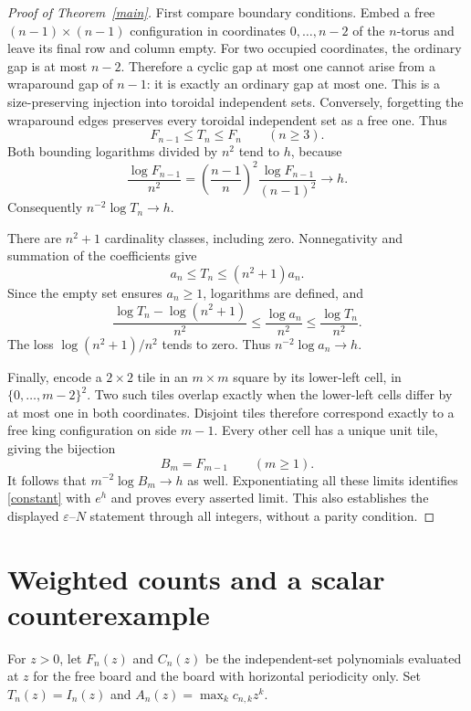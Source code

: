 \documentclass[10pt]{article}
\begin{document}
\begin{proof}[Proof of Theorem~\ref{main}]
First compare boundary conditions. Embed a free $(n-1)\times(n-1)$
configuration in coordinates $0,\ldots,n-2$ of the $n$-torus and
leave its final row and column empty. For two occupied coordinates,
the ordinary gap is at most $n-2$. Therefore a cyclic gap at most
one cannot arise from a wraparound gap of $n-1$: it is exactly an
ordinary gap at most one. This is a size-preserving injection into
toroidal independent sets. Conversely, forgetting the wraparound
edges preserves every toroidal independent set as a free one. Thus
\[
 F_{n-1}\leq T_n\leq F_n\qquad(n\geq3).
 \tag{2}\label{seam}
\]
Both bounding logarithms divided by $n^2$ tend to $h$, because
\[
 \frac{\log F_{n-1}}{n^2}
 =\left(\frac{n-1}{n}\right)^2
   \frac{\log F_{n-1}}{(n-1)^2}\longrightarrow h.
\]
Consequently $n^{-2}\log T_n\to h$.

There are $n^2+1$ cardinality classes, including zero. Nonnegativity
and summation of the coefficients give
\[
 a_n\leq T_n\leq(n^2+1)a_n.
 \tag{3}\label{peak}
\]
Since the empty set ensures $a_n\geq1$, logarithms are defined, and
\[
 \frac{\log T_n-\log(n^2+1)}{n^2}
 \leq\frac{\log a_n}{n^2}\leq\frac{\log T_n}{n^2}.
\]
The loss $\log(n^2+1)/n^2$ tends to zero. Thus
$n^{-2}\log a_n\to h$.

Finally, encode a $2\times2$ tile in an $m\times m$ square by its
lower-left cell, in $\{0,\ldots,m-2\}^2$. Two such tiles overlap
exactly when the lower-left cells differ by at most one in both
coordinates. Disjoint tiles therefore correspond exactly to a free
king configuration on side $m-1$. Every other cell has a unique unit
tile, giving the bijection
\[
 B_m=F_{m-1}\qquad(m\geq1).
 \tag{4}\label{tiling}
\]
It follows that $m^{-2}\log B_m\to h$ as well. Exponentiating all
these limits identifies \eqref{constant} with $e^h$ and proves every
asserted limit. This also establishes the displayed $\varepsilon$--$N$
statement through all integers, without a parity condition.
\end{proof}

\section{Weighted counts and a scalar counterexample}
For $z>0$, let $F_n(z)$ and $C_n(z)$ be the independent-set
polynomials evaluated at $z$ for the free board and the board with
horizontal periodicity only. Set $T_n(z)=I_n(z)$ and
$A_n(z)=\max_k c_{n,k}z^k$.
\end{document}
